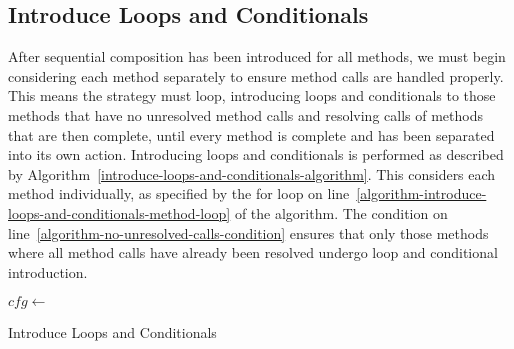 \subsection{Introduce Loops and Conditionals}
\label{introduce-loops-and-conditionals-subsection}

After sequential composition has been introduced for all methods, we
must begin considering each method separately to ensure method calls
are handled properly.
This means the strategy must loop, introducing loops and conditionals
to those methods that have no unresolved method calls and resolving
calls of methods that are then complete, until every method is
complete and has been separated into its own action.
Introducing loops and conditionals is performed as described by
Algorithm~\ref{introduce-loops-and-conditionals-algorithm}.
This considers each method individually, as specified by the for loop
on line~\ref{algorithm-introduce-loops-and-conditionals-method-loop}
of the algorithm. 
The condition on line~\ref{algorithm-no-unresolved-calls-condition}
ensures that only those methods where all method calls have already
been resolved undergo loop and conditional introduction.

\begin{algorithm}
  \begin{algorithmic}[1]
    \label{algorithm-introduce-loops-and-conditionals-method-loop}
    \label{algorithm-no-unresolved-calls-condition}
    \State $cfg \gets$ 
    \label{algorithm-make-control-flow-graph2}
    \label{algorithm-node-checking-loop}
    \State {}
    \label{algorithm-introduce-if}
    \State {}
    \label{algorithm-introduce-if-else}
    \label{algorithm-conditional-check}
    \State {}
    \label{algorithm-introduce-conditional}
    \EndIf
    \State {}
    \label{algorithm-introduce-while1}
    \State {}
    \label{algorithm-introduce-while2}
    \State {}
    \label{algorithm-introduce-do-while}
    \State {}
    \label{algorithm-introduce-infinite-loop}
    \label{algorithm-lci-sequence-check}
    \State
    \label{algorithm-lci-sequence-introduction}
    \EndIf

    \EndFor
    \EndIf
    \EndFor
    \EndProcedure
  \end{algorithmic}
  \caption{Introduce Loops and Conditionals}
  \label{introduce-loops-and-conditionals-algorithm}
\end{algorithm}

